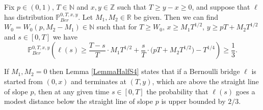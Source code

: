 \begin{lemma}\label{LemmaHalfS4} Fix $p \in (0,1)$, $T \in \mathbb{N}$ and $x, y\in \mathbb{Z}$ such that $T \geq y-x \geq 0$, and suppose that $\ell$ has distribution $\mathbb{P}^{0,T,x,y}_{Ber}$. Let $M_1, M_2 \in \mathbb{R}$ be given. Then we can find $W_0 = W_0(p,M_2 - M_1) \in \mathbb{N}$ such that for $T \geq W_0$, $x \geq M_1 T^{1/2}$, $y \geq pT + M_2 T^{1/2}$ and $s \in [0,T]$ we have
\begin{equation}\label{halfEq1S4}
\mathbb{P}^{0,T,x,y}_{Ber}\left( \ell(s)  \geq \frac{T-s}{T} \cdot M_1 T^{1/2} + \frac{s}{T} \cdot \big(p T + M_2 T^{1/2}\big) - T^{1/4} \right) \geq \frac{1}{3}.
\end{equation}
\end{lemma}
\begin{remark}
If $M_1, M_2 = 0$ then Lemma \ref{LemmaHalfS4} states that if a Bernoulli bridge $\ell$ is started from $(0,x)$ and terminates at $(T,y)$, which are above the straight line of slope $p$, then at any given time $s \in [0,T]$ the probability that $\ell(s)$ goes a modest distance below the straight line of slope $p$ is upper bounded by $ 2/3$.
\end{remark}
